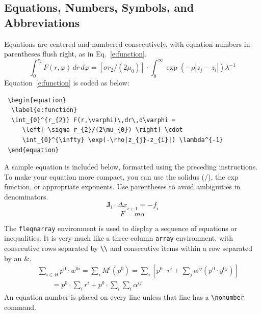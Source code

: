 \documentclass{aiaa-tc}%
\begin{document}
\subsection{Equations, Numbers, Symbols, and Abbreviations}

Equations are centered and numbered consecutively, with equation
numbers in parentheses flush right, as in Eq.~\ref{e:function}.
\begin{equation}
 \label{e:function}
 \int_{0}^{r_{2}} F(r,\varphi)\,dr\,d\varphi =
    \left[ \sigma r_{2}/(2\mu_{0}) \right] \cdot
    \int_{0}^{\infty} \exp(-\rho|z_{j}-z_{i}|) \lambda^{-1} 
\end{equation}
Equation~\ref{e:function} is coded as below:
\begin{Verbatim}
 \begin{equation}
  \label{e:function}
  \int_{0}^{r_{2}} F(r,\varphi)\,dr\,d\varphi =
     \left[ \sigma r_{2}/(2\mu_{0}) \right] \cdot
     \int_{0}^{\infty} \exp(-\rho|z_{j}-z_{i}|) \lambda^{-1}
 \end{equation}
\end{Verbatim}
A sample equation is included below, formatted using the preceding
instructions.
To make your equation more compact, you can use the solidus ($/$), the
exp function, or appropriate exponents.
Use parentheses to avoid ambiguities in denominators.
\begin{equation}
  \label{e:displace}
  \mathbf{J}_i\cdot\Delta\underline{x}_{i+1}=-\underline{f}_i
\end{equation}
\begin{equation}
  \label{e:newton}
  F=m\alpha
\end{equation}

The \verb|fleqnarray| environment is used to display a sequence of
equations or inequalities. It is very much like a three-column
\verb|array| environment, with consecutive rows separated by
\verb|\\| and consecutive items within a row separated by an \&.
\begin{eqnarray}
&&\sum_{i\in H} p^0\cdot w^{0i}=\sum_i M^i (p^0) =
  \sum_i\left[p^0\cdot r^i + \sum_j \alpha^{ij} (p^0\cdot
  y^{0j})\right]\nonumber\\
&&{\qquad}= p^0 \cdot \sum_i r^i + p^0 \cdot \sum_i
\sum_i \alpha^{ij}
\end{eqnarray}
An equation number is placed on every line unless that line has a
\verb|\nonumber| command.
\end{document}
